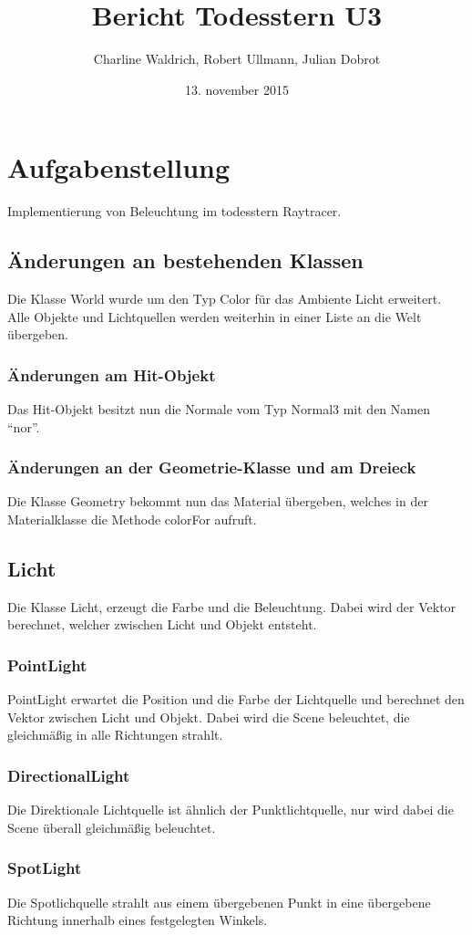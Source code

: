 \documentclass[14pt]{extarticle}
\title{Bericht Todesstern U3}
\author{Charline Waldrich, Robert Ullmann, Julian Dobrot}
\date{13. november 2015}
\begin{document}
\maketitle
\pagebreak
\tableofcontents


\section{Aufgabenstellung}
Implementierung von Beleuchtung im todesstern Raytracer.
\subsection{Änderungen an bestehenden Klassen}
Die Klasse World wurde um den Typ Color für das Ambiente Licht erweitert. Alle Objekte und Lichtquellen werden weiterhin in einer Liste an die Welt übergeben.
\subsubsection{Änderungen am Hit-Objekt}
Das Hit-Objekt besitzt nun die Normale vom Typ Normal3 mit den Namen ``nor''.
\subsubsection{Änderungen an der Geometrie-Klasse und am Dreieck}
Die Klasse Geometry bekommt nun das Material übergeben, welches in der Materialklasse die Methode colorFor aufruft. 

\subsection{Licht}
Die Klasse Licht, erzeugt die Farbe und die Beleuchtung. Dabei wird der Vektor berechnet, welcher zwischen Licht und Objekt entsteht.
\subsubsection{PointLight}
PointLight erwartet die Position und die Farbe der Lichtquelle und berechnet den Vektor zwischen Licht und Objekt. Dabei wird die Scene beleuchtet, die gleichmäßig in alle Richtungen strahlt.
\subsubsection{DirectionalLight}
Die Direktionale Lichtquelle ist ähnlich der Punktlichtquelle, nur wird dabei die Scene überall gleichmäßig beleuchtet.
\subsubsection{SpotLight}
Die Spotlichquelle strahlt aus einem übergebenen Punkt in eine übergebene Richtung innerhalb eines festgelegten Winkels.
\end{document}
